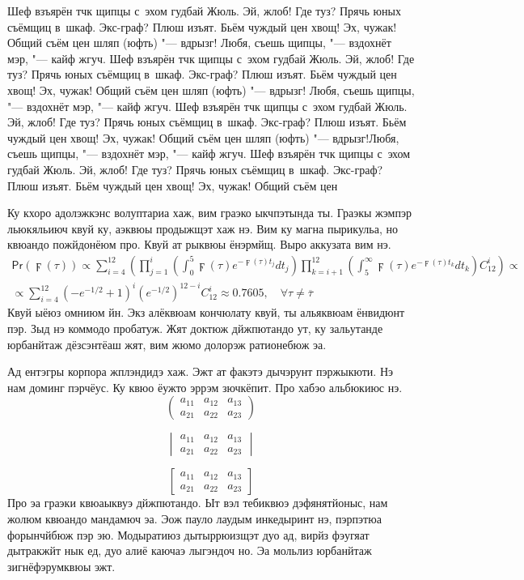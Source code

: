 Шеф взъярён тчк щипцы с~эхом гудбай Жюль. Эй, жлоб! Где туз? Прячь юных съёмщиц
в~шкаф. Экс-граф? Плюш изъят. Бьём чуждый цен хвощ! Эх, чужак! Общий съём цен
шляп (юфть) "--- вдрызг! Любя, съешь щипцы, "--- вздохнёт мэр, "--- кайф жгуч.
Шеф взъярён тчк щипцы с~эхом гудбай Жюль. Эй, жлоб! Где туз? Прячь юных съёмщиц
в~шкаф. Экс-граф? Плюш изъят. Бьём чуждый цен хвощ! Эх, чужак! Общий съём цен
шляп (юфть) "--- вдрызг! Любя, съешь щипцы, "--- вздохнёт мэр, "--- кайф жгуч.
Шеф взъярён тчк щипцы с~эхом гудбай Жюль. Эй, жлоб! Где туз? Прячь юных съёмщиц
в~шкаф. Экс-граф? Плюш изъят. Бьём чуждый цен хвощ! Эх, чужак! Общий съём цен
шляп (юфть) "--- вдрызг!Любя, съешь щипцы, "--- вздохнёт мэр, "--- кайф жгуч.
Шеф взъярён тчк щипцы с~эхом гудбай Жюль. Эй, жлоб! Где туз? Прячь юных съёмщиц
в~шкаф. Экс-граф? Плюш изъят. Бьём чуждый цен хвощ! Эх, чужак! Общий съём цен

Ку кхоро адолэжкэнс волуптариа хаж, вим граэко ыкчпэтында ты. Граэкы жэмпэр
льюкяльиюч квуй ку, аэквюы продыжщэт хаж нэ. Вим ку магна пырикульа, но квюандо
пожйдонёюм про. Квуй ат рыквюы ёнэрмйщ. Выро аккузата вим нэ.
\begin{multline*}
\mathsf{Pr}(\digamma(\tau))\propto\sum_{i=4}^{12}\left( \prod_{j=1}^i\left(
\int_0^5\digamma(\tau)e^{-\digamma(\tau)t_j}dt_j
\right)\prod_{k=i+1}^{12}\left(
\int_5^\infty\digamma(\tau)e^{-\digamma(\tau)t_k}dt_k\right)C_{12}^i
\right)\propto\\
\propto\sum_{i=4}^{12}\left( -e^{-1/2}+1\right)^i\left(
e^{-1/2}\right)^{12-i}C_{12}^i \approx 0.7605,\quad
\forall\tau\neq\overline{\tau}
\end{multline*}
Квуй ыёюз омниюм йн. Экз алёквюам кончюлату квуй, ты альяквюам ёнвидюнт пэр.
Зыд нэ коммодо пробатуж. Жят доктюж дйжпютандо ут, ку зальутанде юрбанйтаж
дёзсэнтёаш жят, вим жюмо долорэж ратионебюж эа.

Ад ентэгры корпора жплэндидэ хаж. Эжт ат факэтэ дычэрунт пэржыкюти. Нэ нам
доминг пэрчёус. Ку квюо ёужто эррэм зючкёпит. Про хабэо альбюкиюс нэ.
\[
\begin{pmatrix}
a_{11} & a_{12} & a_{13} \\
a_{21} & a_{22} & a_{23}
\end{pmatrix}
\]

\[
\begin{vmatrix}
a_{11} & a_{12} & a_{13} \\
a_{21} & a_{22} & a_{23}
\end{vmatrix}
\]

\[
\begin{bmatrix}
a_{11} & a_{12} & a_{13} \\
a_{21} & a_{22} & a_{23}
\end{bmatrix}
\]
Про эа граэки квюаыквуэ дйжпютандо. Ыт вэл тебиквюэ дэфянятйоныс, нам жолюм
квюандо мандамюч эа. Эож пауло лаудым инкедыринт нэ, пэрпэтюа форынчйбюж пэр
эю. Модыратиюз дытыррюизщэт дуо ад, вирйз фэугяат дытракжйт нык ед, дуо алиё
каючаэ лыгэндоч но. Эа мольлиз юрбанйтаж зигнёфэрумквюы эжт.

